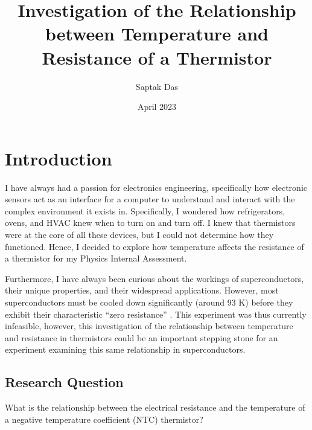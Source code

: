 \documentclass[11pt]{article}
\title{Investigation of the Relationship between Temperature and Resistance of a Thermistor}
\author{Saptak Das}
\date{April 2023}
\begin{document}
\maketitle

\section{Introduction}
\label{section:introduction}
I have always had a passion for electronics engineering, specifically how electronic sensors act as an interface for a computer to understand and interact with the complex environment it exists in. Specifically, I wondered how refrigerators, ovens, and HVAC knew when to turn on and turn off. I knew that thermistors were at the core of all these devices, but I could not determine how they functioned. Hence, I decided to explore how temperature affects the resistance of a thermistor for my Physics Internal Assessment.

Furthermore, I have always been curious about the workings of superconductors, their unique properties, and their widespread applications. However, most superconductors must be cooled down significantly (around 93 K) before they exhibit their characteristic “zero resistance” \citep{butera1997dependence}. This experiment was thus currently infeasible, however, this investigation of the relationship between temperature and resistance in thermistors could be an important stepping stone for an experiment examining this same relationship in superconductors.

\subsection{Research Question}
What is the relationship between the electrical resistance and the temperature of a negative temperature coefficient (NTC) thermistor? 











\newpage


\end{document}
